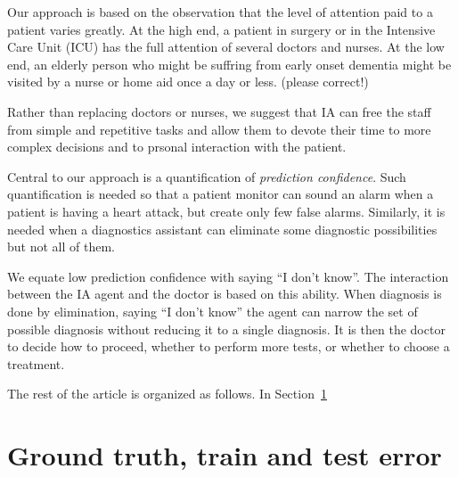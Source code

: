 \documentclass[11pt]{pnas-new}
\begin{document}
Our approach is based on the observation that the level of attention
paid to a patient varies greatly. At the high end, a patient in
surgery or in the Intensive Care Unit (ICU) has the full attention of
several doctors and nurses. At the low end, an elderly person who
might be suffring from early onset dementia might be visited by a
nurse or home aid once a day or less. (please correct!)

Rather than replacing doctors or nurses, we suggest that IA can free
the staff from simple and repetitive tasks and allow them to devote
their time to more complex decisions and to prsonal interaction with
the patient.

Central to our approach is a quantification of {\em prediction confidence}. Such
quantification is needed so that a patient monitor can sound an alarm
when a patient is having a heart attack, but create only few false
alarms. Similarly, it is needed when a diagnostics assistant can
eliminate some diagnostic possibilities but not all of them.

We equate low prediction confidence with saying ``I don't know''. The
interaction between the IA agent and the doctor is based on this
ability. When diagnosis is done by elimination, saying ``I don't
know'' the agent can narrow the set of possible diagnosis without
reducing it to a single diagnosis. It is then the doctor to decide how
to proceed, whether to perform more tests, or whether to choose a treatment.

The rest of the article is organized as follows. In
Section~\ref{sec:ground-truth}

\section{Ground truth, train and test error}
\label{sec:ground-truth}
\end{document}
